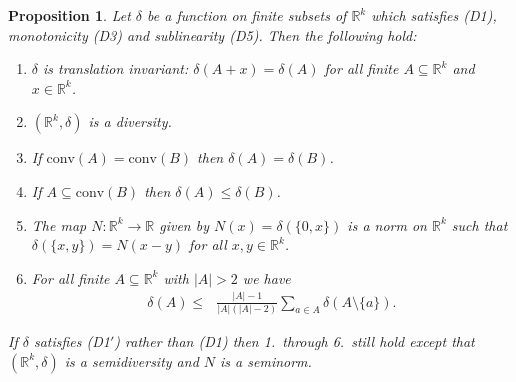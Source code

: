 \documentclass[11pt]{article}
\newtheorem{proposition}[theorem]{Proposition}
\newcommand{\conv}{\mathrm{conv}}
\renewcommand{\Re}{\mathbb{R}}
\begin{document}
\begin{proposition} \label{prop:sublinearProperties}
    Let $\delta$ be a function on finite subsets of $\Re^k$ which satisfies \textnormal{(D1)}, monotonicity \textnormal{(D3)}  and sublinearity \textnormal{(D5)}. Then the following hold:
    \begin{enumerate}
        \item  $\delta$ is translation invariant: $\delta(A + x) = \delta(A)$ for all finite $A \subseteq \Re^k$ and $x \in \Re^k$.
                \item $(\Re^k,\delta)$ is a diversity.
        \item  If $\conv(A) = \conv(B)$ then $\delta(A) = \delta(B)$.
        \item If $A \subseteq \conv(B)$ then $\delta(A) \leq \delta(B)$.
        \item The map $N:\Re^k \rightarrow \Re$ given by $N(x) = \delta(\{0,x\})$ is a norm on $\Re^k$ such that $\delta(\{x,y\}) = N(x-y)$ for all $x,y \in \Re^k$.
        \item For all finite $A \subseteq \Re^k$ with $|A| > 2$ we have
        \begin{align*}\delta(A) \leq \mbox{ $\frac{|A|-1}{|A|(|A|-2)}$}\sum_{a \in A} \delta(A \setminus \{a\}). \end{align*}
    \end{enumerate}
    If $\delta$ satisfies (D1$'$) rather than (D1) then  1.~through 6.~still hold except that $(\Re^k,\delta)$ is a semidiversity and $N$ is a seminorm.  
\end{proposition}
\end{document}

